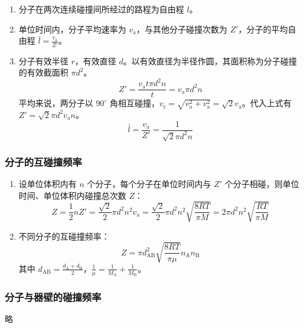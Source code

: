 \begin{enumerate}
    \item 分子在两次连续碰撞间所经过的路程为自由程 $l$。
    \item 单位时间内，分子平均速率为 $v_{\mathrm{a}}$，与其他分子碰撞次数为 $Z'$，分子的平均自由程 $\bar{l} = \frac{v_{\mathrm{a}}}{Z'}$。
    \item 分子有效半径 $r$，有效直径 $d$。以有效直径为半径作圆，其面积称为分子碰撞的有效截面积 $\pi d^2$。
    \begin{equation*}
        Z' = \frac{v_{\mathrm{a}} t \pi d^2 n}{t} = v_{\mathrm{a}} \pi d^2 n
    \end{equation*}
    平均来说，两分子以 $90^{\circ}$ 角相互碰撞，$v_{\mathrm{r}} = \sqrt{v_{\mathrm{a}}^2 + v_{\mathrm{a}}^2} = \sqrt{2}v_{\mathrm{a}}$。代入上式有 $Z' = \sqrt{2} \pi d^2 v_{\mathrm{a}} n$。
    \begin{equation}
        \bar{l} = \frac{v_{\mathrm{a}}}{Z'} = \frac{1}{\sqrt{2} \pi d^2 n}
    \end{equation}
\end{enumerate}

\subsubsection{分子的互碰撞频率}

\begin{enumerate}
    \item 设单位体积内有 $n$ 个分子，每个分子在单位时间内与 $Z'$ 个分子相碰，则单位时间、单位体积内碰撞总次数 $Z$：
    \begin{equation}
        Z = \frac12 n Z' = \frac{\sqrt{2}}{2} \pi d^2 n^2 v_{\mathrm{a}} = \frac{\sqrt{2}}{2} \pi d^2 n^2 \sqrt{\frac{8RT}{\pi M}} = 2\pi d^2 n^2 \sqrt{\frac{RT}{\pi M}}
    \end{equation}
    \item 不同分子的互碰撞频率：
    \begin{equation}
        Z = \pi d_{\mathrm{AB}}^2 \sqrt{\frac{8RT}{\pi \mu}} n_{\mathrm{A}} n_{\mathrm{B}}
    \end{equation}
    其中 $d_{\mathrm{AB}} = \frac{d_{\mathrm{A}} + d_{\mathrm{B}}}{2}$，$\frac{1}{\mu} = \frac{1}{M_{\mathrm{A}}} + \frac{1}{M_{\mathrm{B}}}$。
\end{enumerate}

\subsubsection{分子与器壁的碰撞频率}
略

